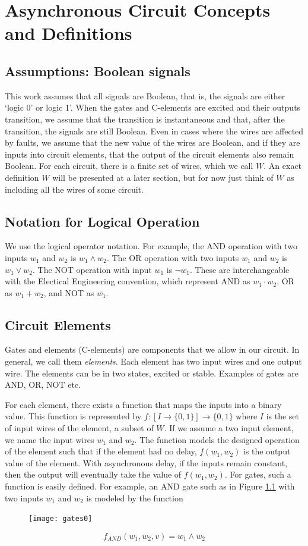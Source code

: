 \documentclass[12pt]{report}
\begin{document}
\chapter{Asynchronous Circuit Concepts and Definitions}
\section{Assumptions:  Boolean signals}
This work assumes that all signals are Boolean, that is, the signals are either `logic 0' or logic 1'.  When the gates and C-elements are excited and their outputs transition, we assume that the transition is instantaneous and that, after the transition, the signals are still Boolean.   
Even in cases where the wires are affected by faults, we assume that the new value of the wires are Boolean, and if they are inputs into circuit elements, that the output of the circuit elements also remain Boolean.  For each circuit, there is a finite set of wires, which we call $W$.  An exact definition $W$ will be presented at a later section, but for now just think of $W$ as including all the wires of some circuit.

\section{Notation for Logical Operation}
We use the logical operator notation.  For example, the AND operation with two inputs $w_1$ and $w_2$ is $w_1\wedge w_2$.
The OR operation with two inputs $w_1$ and $w_2$ is $w_1\vee w_2$.  The NOT operation with input $w_1$ is $\neg w_1$.  These are interchangeable with the Electical Engineering convention, which represent AND as $w_1\cdot w_2$, OR as $w_1+w_2$, and NOT as $\overline{w_1}$.

\section{Circuit Elements}
Gates and elements (C-elements) are components that we allow in our circuit.  In general, we call them {\em elements}.  Each element has two input wires and one output wire.  The elements can be in two states, excited or stable.  Examples of gates are AND, OR, NOT etc.

For each element, there exists a function that maps the inputs into a binary value.  This function is represented by $f:[I \to \{0,1\}] \to \{0,1\}$ where $I$ is the set of input wires of the element, a subset of $W$.  If we assume a two input element, we name the input wires $w_1$ and $w_2$.  The function models the designed operation of the element such that if the element had no delay, $f(w_1,w_2)$ is the output value of the element.  With asynchronous delay, if the inputs remain constant, then the output will eventually take the value of $f(w_1,w_2)$.  For gates, such a function is easily defined.  For example, an AND gate such as in Figure \ref{fig:gates0} with two inputs $w_1$ and $w_2$ is modeled by the function 
\begin{figure}[h]
\centering
\texttt{[image: gates0]}
\label{fig:gates0}
\end{figure}
\[
f_{AND}(w_1,w_2,v)= w_1\wedge w_2
\]
\end{document}
